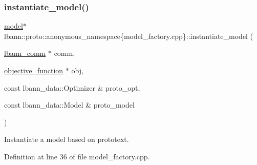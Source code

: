 \mbox{\label{namespacelbann_1_1proto_1_1anonymous__namespace_02model__factory_8cpp_03_a6a08f0b26d015824ef28ddbb66b6d4c0}} 
\subsubsection{\texorpdfstring{instantiate\+\_\+model()}{instantiate\_model()}}
{\footnotesize\ttfamily \hyperlink{classlbann_1_1model}{model}$\ast$ lbann\+::proto\+::anonymous\+\_\+namespace\{model\+\_\+factory.\+cpp\}\+::instantiate\+\_\+model (\begin{DoxyParamCaption}\item[{\hyperlink{classlbann_1_1lbann__comm}{lbann\+\_\+comm} $\ast$}]{comm,  }\item[{\hyperlink{classlbann_1_1objective__function}{objective\+\_\+function} $\ast$}]{obj,  }\item[{const lbann\+\_\+data\+::\+Optimizer \&}]{proto\+\_\+opt,  }\item[{const lbann\+\_\+data\+::\+Model \&}]{proto\+\_\+model }\end{DoxyParamCaption})}

Instantiate a model based on prototext. 

Definition at line 36 of file model\+\_\+factory.\+cpp.



